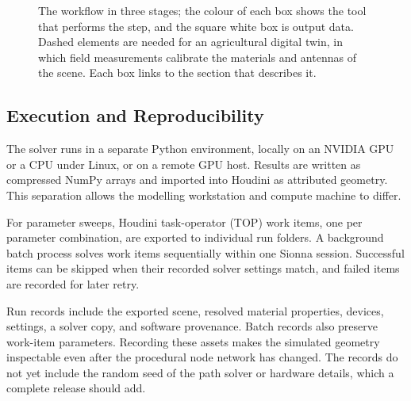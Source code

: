 \begin{figure}[t]
\caption{The \housionna{} workflow in three stages; the colour of each box shows the tool that performs the step, and the square white box is output data. Dashed elements are needed for an agricultural digital twin, in which field measurements calibrate the materials and antennas of the scene. Each box links to the section that describes it.}
\label{fig:pipeline}
\end{figure}




\subsection{Execution and Reproducibility}\label{sec:execution}The solver runs in a separate Python environment, locally on an NVIDIA GPU or a CPU under Linux, or on a remote GPU host. Results are written as compressed NumPy arrays and imported into Houdini as attributed geometry. This separation allows the modelling workstation and compute machine to differ.

For parameter sweeps, Houdini task-operator (TOP) work items, one per parameter combination, are exported to individual run folders. A background batch process solves work items sequentially within one Sionna session. Successful items can be skipped when their recorded solver settings match, and failed items are recorded for later retry.

Run records include the exported scene, resolved material properties, devices, settings, a solver copy, and software provenance. Batch records also preserve work-item parameters. Recording these assets makes the simulated geometry inspectable even after the procedural node network has changed. The records do not yet include the random seed of the path solver or hardware details, which a complete release should add.

